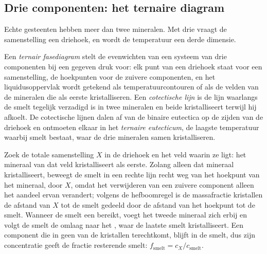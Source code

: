 \subsection*{Drie componenten: het ternaire diagram}

Echte gesteenten hebben meer dan twee mineralen. Met drie vraagt de samenstelling een
driehoek, en wordt de temperatuur een derde dimensie.

\begin{definition}\label{def:b2:mantle-melting:ternary}
Een \emph{ternair fasediagram} stelt de
evenwichten van een systeem van drie componenten bij een gegeven druk voor: elk punt van een
driehoek staat voor een samenstelling, de hoekpunten voor de zuivere componenten, en het
liquidusoppervlak wordt getekend als temperatuurcontouren of als de velden van de
mineralen die als eerste kristalliseren. Een \emph{cotectische lijn} is
de lijn waarlangs de smelt tegelijk verzadigd is in twee mineralen en
beide kristalliseert terwijl hij afkoelt. De cotectische lijnen dalen af van de binaire
eutectica op de zijden van de driehoek en ontmoeten elkaar in het \emph{ternaire
eutecticum}, de laagste temperatuur waarbij smelt bestaat,
waar de drie mineralen samen kristalliseren.
\end{definition}

\begin{method}\label{met:b2:mantle-melting:ternary}
Zoek de totale samenstelling $X$ in de driehoek en het veld waarin ze ligt:
het mineraal van dat veld kristalliseert als eerste. Zolang alleen dat mineraal kristalliseert,
beweegt de smelt in een rechte lijn recht weg van het hoekpunt van het mineraal,
door $X$, omdat het verwijderen van een zuivere component alleen het aandeel ervan verandert; volgens de
hefboomregel is de massafractie kristallen de afstand van $X$ tot de smelt
gedeeld door de afstand van het hoekpunt tot de smelt. Wanneer de smelt een
 bereikt, voegt het tweede mineraal zich erbij en volgt de smelt de 
omlaag naar het , waar de laatste smelt kristalliseert. Een component
die in geen van de kristallen terechtkomt, blijft in de smelt, dus zijn concentratie geeft
de fractie resterende smelt: $f_{\text{smelt}} = c_X/c_{\text{smelt}}$.
\end{method}

